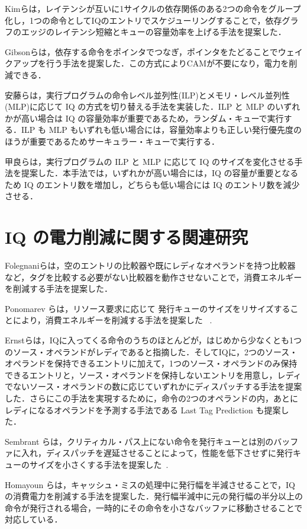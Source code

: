 Kimらは，レイテンシが互いに1サイクルの依存関係のある2つの命令をグループ化し，1つの命令としてIQのエントリでスケジューリングすることで，依存グラフのエッジのレイテンシ短縮とキューの容量効率を上げる手法を提案した\cite{Kim2003}．

Gibsonらは，依存する命令をポインタでつなぎ，ポインタをたどることでウェイクアップを行う手法を提案した\cite{Gibson2010}．この方式によりCAMが不要になり，電力を削減できる．

安藤らは，実行プログラムの命令レベル並列性(ILP)とメモリ・レベル並列性(MLP)に応じて IQ の方式を切り替える手法を実装した\cite{Ando2019}．ILP と MLP のいずれかが高い場合は IQ の容量効率が重要であるため，ランダム・キューで実行する．ILP も MLP もいずれも低い場合には，容量効率よりも正しい発行優先度のほうが重要であるためサーキュラー・キューで実行する．

甲良らは，実行プログラムの ILP と MLP に応じて IQ のサイズを変化させる手法を提案した\cite{Kora2013}．本手法では，いずれかが高い場合には，IQ の容量が重要となるため IQ のエントリ数を増加し，どちらも低い場合には IQ のエントリ数を減少させる．

\section{IQ の電力削減に関する関連研究}
\label{sec:relate_energy}
Folegnaniらは，空のエントリの比較器や既にレディなオペランドを持つ比較器など，タグを比較する必要がない比較器を動作させないことで，消費エネルギーを削減する手法を提案した\cite{folegnani2001}．

Ponomarev らは，リソース要求に応じて 発行キューのサイズをリサイズすることにより，消費エネルギーを削減する手法を提案した~\cite{ponomarev2001} .

Ernstらは，IQに入ってくる命令のうちのほとんどが，はじめから少なくとも1つのソース・オペランドがレディであると指摘した\cite{ernst2002}．そしてIQに，2つのソース・オペランドを保持できるエントリに加えて，1つのソース・オペランドのみ保持できるエントリと，ソース・オペランドを保持しないエントリを用意し，レディでないソース・オペランドの数に応じていずれかにディスパッチする手法を提案した．さらにこの手法を実現するために，命令の2つのオペランドの内，あとにレディになるオペランドを予測する手法である Last Tag Prediction も提案した．

Sembrant らは，クリティカル・パス上にない命令を発行キューとは別のバッファに入れ，ディスパッチを遅延させることによって，性能を低下させずに発行キューのサイズを小さくする手法を提案した~\cite{Sembrant2015}.

Homayoun らは，キャッシュ・ミスの処理中に発行幅を半減させることで，IQの消費電力を削減する手法を提案した\cite{H.Homayoun2011}．発行幅半減中に元の発行幅の半分以上の命令が発行される場合，一時的にその命令を小さなバッファに移動させることで対応している．

